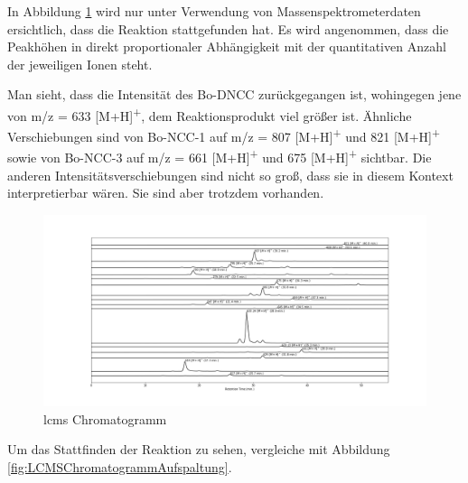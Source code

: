 In Abbildung \ref{fig:LCMSChromatogrammRPAufspaltung} wird nur unter Verwendung von Massenspektrometerdaten ersichtlich, dass die Reaktion stattgefunden hat. Es wird angenommen, dass die Peakhöhen in direkt proportionaler Abhängigkeit mit der quantitativen Anzahl der jeweiligen Ionen steht.

Man sieht, dass die Intensität des Bo-DNCC zurückgegangen ist, wohingegen jene von m/z = 633 [M+H]\textsuperscript{+}, dem Reaktionsprodukt viel größer ist. Ähnliche Verschiebungen sind von Bo-NCC-1 auf m/z = 807 [M+H]\textsuperscript{+} und 821 [M+H]\textsuperscript{+} sowie von Bo-NCC-3 auf m/z = 661 [M+H]\textsuperscript{+} und 675 [M+H]\textsuperscript{+} sichtbar. Die anderen Intensitätsverschiebungen sind nicht so groß, dass sie in diesem Kontext interpretierbar wären. Sie sind aber trotzdem vorhanden.

\begin{figure}[!htbp]
  \centering
  \includegraphics[width=1.4\textwidth, center]{figures/Kapitel6/Reaktion3h/Kuerbis_Analyse_Reaktion3h_LC-ESI-MS.png}
  \caption[LC-MS Chromatogramm nach 3h Reaktionsdauer - Aufspaltung, Quelle: Autor]{\gls{lcms} Chromatogramm}
  \label{fig:LCMSChromatogrammRPAufspaltung}
\end{figure}

Um das Stattfinden der Reaktion zu sehen, vergleiche mit Abbildung \ref{fig:LCMSChromatogrammAufspaltung}.

